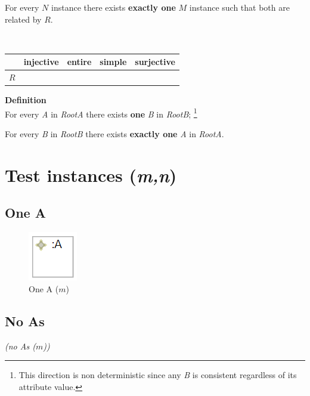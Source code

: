 \documentclass{article}
\newcommand{\cmark}{\ding{51}}%
\begin{document}
For every $N$ instance there
exists \textbf{exactly one} $M$ instance such that both are related by $R$.

~\\

\begin{center}
\begin{tabular}{| c | c | c | c | c | }
  \hline                        
   & injective & entire & simple & surjective \\
  \hline 
  $R$ & \cmark & \cmark &  & \cmark\\
  \hline  
\end{tabular}
\end{center}


\textbf{Definition}\\

For every \textit{A} in \textit{RootA} there
exists \textbf{one} \textit{B} in \textit{RootB}; \footnote{This direction is non deterministic since any \textit{B} is consistent regardless of its attribute value.}

For every \textit{B} in \textit{RootB} there
exists \textbf{exactly one} \textit{A} in \textit{RootA}.


\pagebreak
\section{Test instances (\textit{m,n})}

\subsection{One A}
\label{sec:oneA}

\begin{figure}[ht]
    \centering
    \includegraphics[scale=0.35]{printscreens/inst-oneA.png}
    \caption{One A ($m$)}
    \label{fig:oneA}
\end{figure}

\subsection{No As}
\label{sec:noAs}

\begin{center}
\textit{(no As ($m$))}
\end{center}
\end{document}
